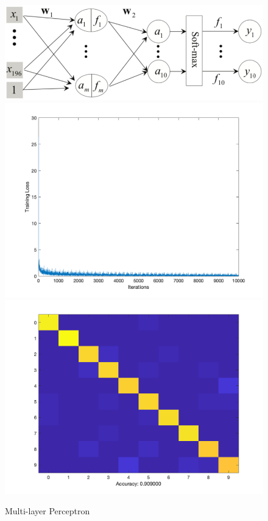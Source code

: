 \documentclass[letter, 10pt]{article}
\begin{document}
\begin{figure}[H]
        \centering
        \includegraphics[width=\textwidth]{HW4/RESULT/MLP.png}
    \endminipage\hfill
        \centering
        \includegraphics[width=1.1\textwidth]{HW4/RESULT/MLP_loss.png}
    \endminipage\hfill
        \centering
        \includegraphics[width=1.1\textwidth]{HW4/RESULT/MLP_CONFUSION.png}
    \endminipage\hfill
    \caption{Multi-layer Perceptron}
\end{figure}
\end{document}
